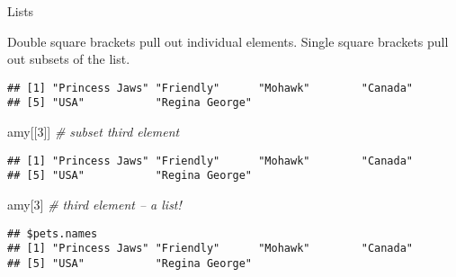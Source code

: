 \documentclass[ignorenonframetext,]{beamer}
\newenvironment{Shaded}{\begin{snugshade}}{\end{snugshade}}
\newcommand{\CommentTok}[1]{\textcolor[rgb]{0.56,0.35,0.01}{\textit{#1}}}
\newcommand{\DecValTok}[1]{\textcolor[rgb]{0.00,0.00,0.81}{#1}}
\newcommand{\NormalTok}[1]{#1}
\newcommand{\OperatorTok}[1]{\textcolor[rgb]{0.81,0.36,0.00}{\textbf{#1}}}
\begin{document}
\begin{frame}[fragile]{Lists}
\protect\hypertarget{lists-1}{}

Double square brackets pull out individual elements. Single square
brackets pull out subsets of the list.

\footnotesize

\begin{Shaded}
\end{Shaded}

\begin{verbatim}
## [1] "Princess Jaws" "Friendly"      "Mohawk"        "Canada"       
## [5] "USA"           "Regina George"
\end{verbatim}

\begin{Shaded}
\begin{Highlighting}[]
\NormalTok{amy[[}\DecValTok{3}\NormalTok{]] }\CommentTok{# subset third element}
\end{Highlighting}
\end{Shaded}

\begin{verbatim}
## [1] "Princess Jaws" "Friendly"      "Mohawk"        "Canada"       
## [5] "USA"           "Regina George"
\end{verbatim}

\begin{Shaded}
\begin{Highlighting}[]
\NormalTok{amy[}\DecValTok{3}\NormalTok{] }\CommentTok{# third element -- a list!}
\end{Highlighting}
\end{Shaded}

\begin{verbatim}
## $pets.names
## [1] "Princess Jaws" "Friendly"      "Mohawk"        "Canada"       
## [5] "USA"           "Regina George"
\end{verbatim}

\end{frame}
\end{document}
